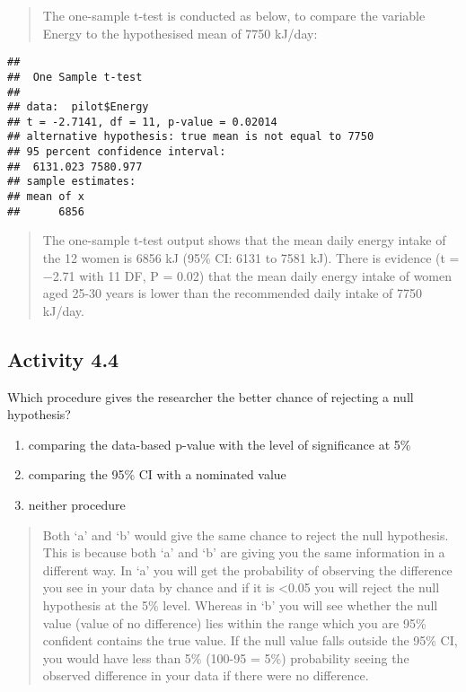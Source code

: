 \documentclass[
]{memoir}
\newenvironment{Shaded}{\begin{snugshade}}{\end{snugshade}}
\newcommand{\AttributeTok}[1]{\textcolor[rgb]{0.77,0.63,0.00}{#1}}
\newcommand{\DecValTok}[1]{\textcolor[rgb]{0.00,0.00,0.81}{#1}}
\newcommand{\FunctionTok}[1]{\textcolor[rgb]{0.00,0.00,0.00}{#1}}
\newcommand{\NormalTok}[1]{#1}
\newcommand{\SpecialCharTok}[1]{\textcolor[rgb]{0.00,0.00,0.00}{#1}}
\providecommand{\tightlist}{%
  \setlength{\itemsep}{0pt}\setlength{\parskip}{0pt}}
\begin{document}
\begin{quote}
The one-sample t-test is conducted as below, to compare the variable Energy to the hypothesised mean of 7750 kJ/day:
\end{quote}

\begin{Shaded}
\end{Shaded}

\begin{verbatim}
## 
##  One Sample t-test
## 
## data:  pilot$Energy
## t = -2.7141, df = 11, p-value = 0.02014
## alternative hypothesis: true mean is not equal to 7750
## 95 percent confidence interval:
##  6131.023 7580.977
## sample estimates:
## mean of x 
##      6856
\end{verbatim}

\begin{quote}
The one-sample t-test output shows that the mean daily energy intake of the 12 women is 6856 kJ (95\% CI: 6131 to 7581 kJ). There is evidence (t = −2.71 with 11 DF, P = 0.02) that the mean daily energy intake of women aged 25-30 years is lower than the recommended daily intake of 7750 kJ/day.
\end{quote}

\hypertarget{activity-4.4}{%
\subsection*{Activity 4.4}\label{activity-4.4}}

Which procedure gives the researcher the better chance of rejecting a null hypothesis?

\begin{enumerate}
\def\labelenumi{\alph{enumi})}
\tightlist
\item
  comparing the data-based p-value with the level of significance at 5\%
\item
  comparing the 95\% CI with a nominated value
\item
  neither procedure
\end{enumerate}

\begin{quote}
Both `a' and `b' would give the same chance to reject the null hypothesis. This is because both `a' and `b' are giving you the same information in a different way. In `a' you will get the probability of observing the difference you see in your data by chance and if it is \textless0.05 you will reject the null hypothesis at the 5\% level. Whereas in `b' you will see whether the null value (value of no difference) lies within the range which you are 95\% confident contains the true value. If the null value falls outside the 95\% CI, you would have less than 5\% (100-95 = 5\%) probability seeing the observed difference in your data if there were no difference.
\end{quote}
\end{document}
